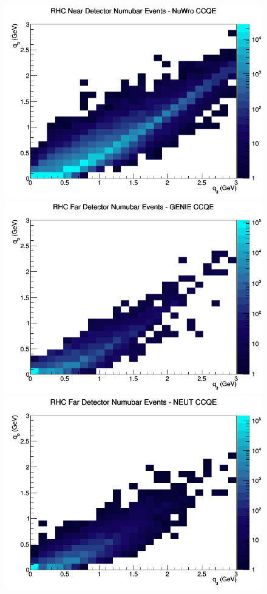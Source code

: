 \documentclass[12pt]{article}
\begin{document}
\begin{figure}[h]
\includegraphics[width=\linewidth]{eff_q0_q3/GAr/CCQE_RHC_ND_numubar_q3_q0_NuWro.png}
\endminipage
\newline
{}
\includegraphics[width=\linewidth]{eff_q0_q3/GAr/CCQE_RHC_FD_numubar_q3_q0_GENIE.png}
\endminipage
{}
\includegraphics[width=\linewidth]{eff_q0_q3/GAr/CCQE_RHC_FD_numubar_q3_q0_NEUT.png}

\end{figure}
\end{document}
